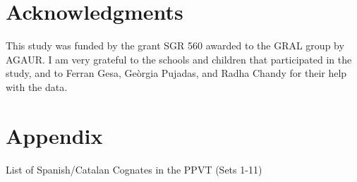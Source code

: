 \documentclass[output=paper,modfonts,nonflat,newtxmath]{langsci/langscibook}
\begin{document}
\section*{Acknowledgments}

{This study was funded by the grant SGR 560 awarded to the GRAL group by AGAUR. I am very grateful to the schools and children that participated in the study, and to Ferran Gesa, Geòrgia Pujadas, and Radha Chandy for their help with the data.}


\section*{Appendix}


List of Spanish/Catalan Cognates in the PPVT (Sets 1-11)\\
\end{document}
